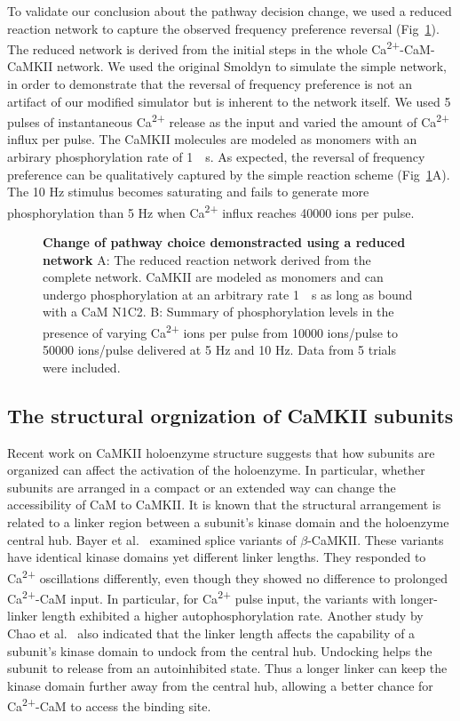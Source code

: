 \documentclass[10pt,letterpaper]{article}
\begin{document}
To validate our conclusion about the pathway decision change, we used a reduced reaction network to capture the observed frequency preference reversal (Fig~\ref{fig12}). The reduced network is derived from the initial steps in the whole Ca\textsuperscript{2+}-CaM-CaMKII network. We used the original Smoldyn to simulate the simple network, in order to demonstrate that the reversal of frequency preference is not an artifact of our modified simulator but is inherent to the network itself. We used 5 pulses of instantaneous Ca\textsuperscript{2+} release as the input and varied the amount of Ca\textsuperscript{2+} influx per pulse. The CaMKII molecules are modeled as monomers with an arbirary phosphorylation rate of \SI{1}{\per\s}. As expected, the reversal of frequency preference can be qualitatively captured by the simple reaction scheme (Fig~\ref{fig12}A). The 10 Hz stimulus becomes saturating and fails to generate more phosphorylation than 5 Hz when Ca\textsuperscript{2+} influx reaches 40000 ions per pulse.

\begin{figure}[!h]
	\caption{{\bf Change of pathway choice demonstracted using a reduced network}
	A: The reduced reaction network derived from the complete network. CaMKII are modeled as monomers and can undergo phosphorylation at an arbitrary rate \SI{1}{\per\s} as long as bound with a CaM N1C2. 
	B: Summary of phosphorylation levels in the presence of varying Ca\textsuperscript{2+} ions per pulse from 10000 ions/pulse to 50000 ions/pulse delivered at 5 Hz and 10 Hz. Data from 5 trials were included.
	}
\label{fig12}
\end{figure}


\subsection*{The structural orgnization of CaMKII subunits}

Recent work on CaMKII holoenzyme structure suggests that how subunits are organized can affect the activation of the holoenzyme. In particular, whether subunits are arranged in a compact or an extended way can change the accessibility of CaM to CaMKII. It is known that the structural arrangement is related to a linker region between a subunit's kinase domain and the holoenzyme central hub. Bayer et al.~\cite{Bayer:2002er} examined splice variants of $\beta$-CaMKII. These variants have identical kinase domains yet different linker lengths. They responded to Ca\textsuperscript{2+} oscillations differently, even though they showed no difference to prolonged Ca\textsuperscript{2+}-CaM input. In particular, for Ca\textsuperscript{2+} pulse input, the variants with longer-linker length exhibited a higher autophosphorylation rate. Another study by Chao et al.~\cite{Chao:2011iw} also indicated that the linker length affects the capability of a subunit's kinase domain to undock from the central hub. Undocking helps the subunit to release from an autoinhibited state. Thus a longer linker can keep the kinase domain further away from the central hub, allowing a better chance for Ca\textsuperscript{2+}-CaM to access the binding site.
\end{document}
